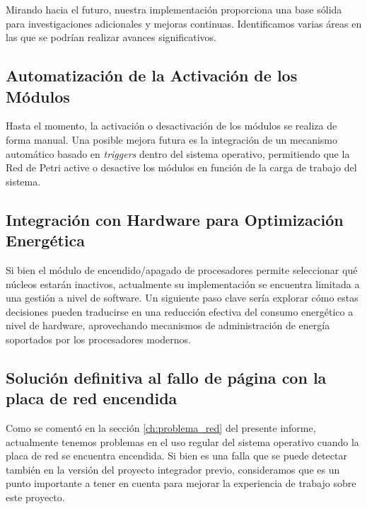 Mirando hacia el futuro, nuestra implementación proporciona una base sólida para investigaciones adicionales y mejoras continuas. Identificamos varias áreas en las que se podrían realizar avances significativos.\par

\subsection{Automatización de la Activación de los Módulos}
Hasta el momento, la activación o desactivación de los módulos se realiza de forma manual. Una posible mejora futura es la integración de un mecanismo automático basado en \textit{triggers} dentro del sistema operativo, permitiendo que la Red de Petri active o desactive los módulos en función de la carga de trabajo del sistema.\par

\subsection{Integración con Hardware para Optimización Energética}
Si bien el módulo de encendido/apagado de procesadores permite seleccionar qué núcleos estarán inactivos, actualmente su implementación se encuentra limitada a una gestión a nivel de software. Un siguiente paso clave sería explorar cómo estas decisiones pueden traducirse en una reducción efectiva del consumo energético a nivel de hardware, aprovechando mecanismos de administración de energía soportados por los procesadores modernos.\par

\subsection{Solución definitiva al fallo de página con la placa de red encendida}
Como se comentó en la sección \ref{ch:problema_red} del presente informe, actualmente tenemos problemas en el uso regular del sistema operativo cuando la placa de red se encuentra encendida. Si bien es una falla que se puede detectar también en la versión del proyecto integrador previo, consideramos que es un punto importante a tener en cuenta para mejorar la experiencia de trabajo sobre este proyecto.\par

